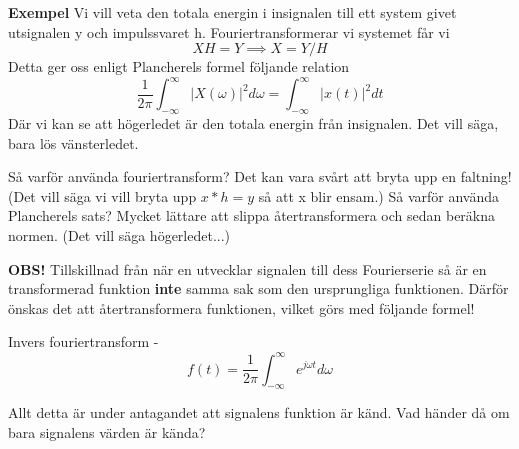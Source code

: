 \documentclass{article}
\begin{document}
\textbf{Exempel}
Vi vill veta den totala energin i insignalen till ett system givet utsignalen y och impulssvaret h. Fouriertransformerar vi systemet får vi 
\[XH = Y \implies X = Y/H\]
Detta ger oss enligt Plancherels formel följande relation
\[ \frac{1}{2 \pi} \int_{-\infty}^{\infty} |X(\omega)|^2 d \omega = \int_{-\infty}^{\infty} |x(t)|^2 d t \]
Där vi kan se att högerledet är den totala energin från insignalen. 
Det vill säga, bara lös vänsterledet. 

Så varför använda fouriertransform? Det kan vara svårt att bryta upp en faltning! (Det vill säga vi vill bryta upp $x*h=y$ så att x blir ensam.)
Så varför använda Plancherels sats? Mycket lättare att slippa återtransformera och sedan beräkna normen. (Det vill säga högerledet...)

\textbf{OBS!} Tillskillnad från när en utvecklar signalen till dess Fourierserie så är en transformerad funktion \textbf{inte} samma sak som den ursprungliga funktionen. Därför önskas det att återtransformera funktionen, vilket görs med följande formel!

Invers fouriertransform - 
\[f(t) = \frac{1}{2 \pi} \int_{-\infty}^{\infty}  e^{j \omega t} d\omega \]

Allt detta är under antagandet att signalens funktion är känd. Vad händer då om bara signalens värden är kända?

\end{document}
